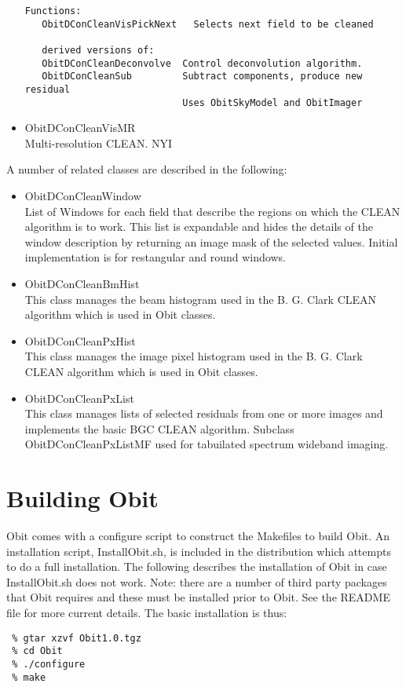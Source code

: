 \documentclass[11pt]{article}
\begin{document}
\begin{itemize}
\begin{verbatim}
Functions:
   ObitDConCleanVisPickNext   Selects next field to be cleaned

   derived versions of:
   ObitDConCleanDeconvolve  Control deconvolution algorithm.
   ObitDConCleanSub         Subtract components, produce new residual
                            Uses ObitSkyModel and ObitImager

\end{verbatim}
\item ObitDConCleanVisMR\\
Multi-resolution CLEAN.
NYI
\end{itemize}
 
A number of related classes are described in the following:
\begin{itemize}
\item ObitDConCleanWindow\\
List of Windows for each field that describe the regions on which the
CLEAN algorithm is to work.
This list is expandable and hides the details of the window description
by returning an image mask of the selected values.
Initial implementation is for restangular and round windows.
\item ObitDConCleanBmHist\\
This class manages the beam histogram used in the B. G. Clark CLEAN
algorithm which is used in Obit classes.
\item ObitDConCleanPxHist\\
This class manages the image pixel histogram used in the B. G. Clark
CLEAN algorithm which is used in Obit classes.
\item ObitDConCleanPxList\\
This class manages lists of selected residuals from one or more images
and implements the basic BGC CLEAN algorithm.
Subclass ObitDConCleanPxListMF used for tabuilated spectrum wideband imaging.
\end{itemize}

\section{Building Obit}
Obit comes with a configure script to construct the Makefiles to build
Obit.
An installation script, InstallObit.sh, is included in the
distribution which attempts to do a full installation.
The following describes the installation of Obit in case
InstallObit.sh does not work. 
Note: there are a number of third party packages that Obit requires
and these must be installed prior to Obit.
See the README file for more current details.
The basic installation is thus:
\begin{verbatim}
 % gtar xzvf Obit1.0.tgz
 % cd Obit
 % ./configure
 % make
\end{verbatim}
\end{document}
